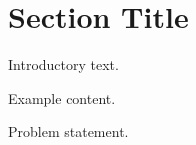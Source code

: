 \documentclass[final,a4paper,12pt]{article}
\begin{document}
\maketitle
\tableofcontents

\section{Section Title}

Introductory text.

\begin{example}
Example content.
\end{example}

\begin{problem}
Problem statement.
\end{problem}
\end{document}
